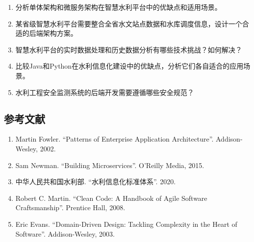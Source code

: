 \begin{enumerate}
\def\labelenumi{\arabic{enumi}.}
\tightlist
\item
  分析单体架构和微服务架构在智慧水利平台中的优缺点和适用场景。
\item
  某省级智慧水利平台需要整合全省水文站点数据和水库调度信息，设计一个合适的后端架构方案。
\item
  智慧水利平台的实时数据处理和历史数据分析有哪些技术挑战？如何解决？
\item
  比较Java和Python在水利信息化建设中的优缺点，分析它们各自适合的应用场景。
\item
  水利工程安全监测系统的后端开发需要遵循哪些安全规范？
\end{enumerate}

\subsection{参考文献}\label{ux53c2ux8003ux6587ux732e}

\begin{enumerate}
\def\labelenumi{\arabic{enumi}.}
\tightlist
\item
  Martin Fowler. ``Patterns of Enterprise Application Architecture''.
  Addison-Wesley, 2002.
\item
  Sam Newman. ``Building Microservices''. O'Reilly Media, 2015.
\item
  中华人民共和国水利部. ``水利信息化标准体系''. 2020.
\item
  Robert C. Martin. ``Clean Code: A Handbook of Agile Software
  Craftsmanship''. Prentice Hall, 2008.
\item
  Eric Evans. ``Domain-Driven Design: Tackling Complexity in the Heart
  of Software''. Addison-Wesley, 2003.
\end{enumerate}
